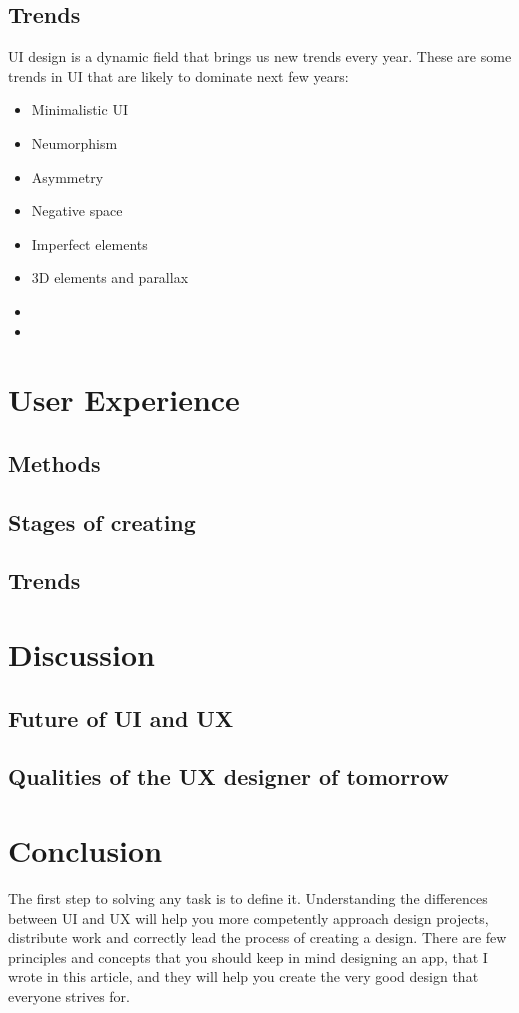 \documentclass[10pt,twoside,english,a4paper]{article}
\begin{document}
\subsection{Trends}
UI design is a dynamic field that brings us new trends every year. These are some trends in UI that are likely to dominate next few years:
\begin{itemize}
\item Minimalistic UI
\item Neumorphism
\item Asymmetry
\item Negative space
\item Imperfect elements
\item 3D elements and parallax
\item
\item
\end{itemize}

\section{User Experience} \label{UX}

\subsection{Methods}

\subsection{Stages of creating}	

\subsection{Trends}

\section{Discussion}
\subsection{Future of UI and UX}
\subsection{Qualities of the UX designer of tomorrow}

\section{Conclusion}
The first step to solving any task is to define it. Understanding the
differences between UI and UX will help you more competently approach design projects, distribute work and correctly lead the process of creating a design. There are few principles and concepts that you should keep in mind designing an app, that I wrote in this article, and they will help you create the very good design that everyone strives for.	




\end{document}
